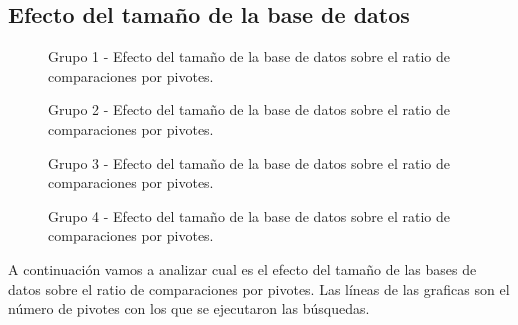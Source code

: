 \subsection{Efecto del tamaño de la base de datos}

\begin{figure}[tb]
\centering
{}
		\caption{\small Grupo 1 - Efecto del tamaño de la base de datos sobre el ratio de comparaciones por pivotes.}
		\label{fig:EDB-g1}
		\caption{\small Grupo 2 - Efecto del tamaño de la base de datos sobre el ratio de comparaciones por pivotes.}
		\label{fig:EDB-g2}
\end{figure}

\begin{figure}[tb]
\centering
{}
		\caption{\small Grupo 3 - Efecto del tamaño de la base de datos sobre el ratio de comparaciones por pivotes.}
		\label{fig:EDB-g3}
\end{figure}

\begin{figure}[tb]
\centering
{}
		\caption{\small Grupo 4 - Efecto del tamaño de la base de datos sobre el ratio de comparaciones por pivotes.}
		\label{fig:EDB-g4}
\end{figure}
 
A continuaci\'on vamos a analizar cual es el efecto del tama\~no de las bases de datos sobre el ratio de comparaciones por pivotes. Las l\'ineas de las graficas son el n\'umero de pivotes con los que se ejecutaron las b\'usquedas.\\

